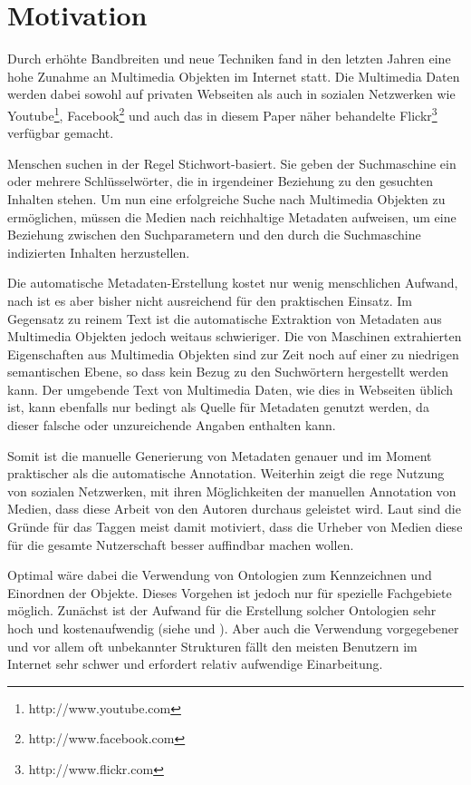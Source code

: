 \section{Motivation}

Durch erhöhte Bandbreiten und neue Techniken fand in den letzten Jahren eine hohe Zunahme an Multimedia Objekten im Internet statt. Die Multimedia Daten werden dabei sowohl auf privaten Webseiten als auch in sozialen Netzwerken wie Youtube\footnote{http://www.youtube.com}, Facebook\footnote{http://www.facebook.com} und auch das in diesem Paper näher behandelte Flickr\footnote{http://www.flickr.com} verfügbar gemacht.

Menschen suchen in der Regel Stichwort-basiert. Sie geben der Suchmaschine ein oder mehrere Schlüsselwörter, die in irgendeiner Beziehung zu den gesuchten Inhalten stehen. Um nun eine erfolgreiche Suche nach Multimedia Objekten zu ermöglichen, müssen die Medien nach \cite{collectiveKnowledge} reichhaltige Metadaten aufweisen, um eine Beziehung zwischen den Suchparametern und den durch die Suchmaschine indizierten Inhalten herzustellen. 

Die automatische Metadaten-Erstellung kostet nur wenig menschlichen Aufwand, nach \cite{combiningMultipleEvidence} ist es aber bisher nicht ausreichend für den praktischen Einsatz. Im Gegensatz zu reinem Text ist die automatische Extraktion von Metadaten aus Multimedia Objekten jedoch weitaus schwieriger. Die von Maschinen extrahierten Eigenschaften aus Multimedia Objekten sind zur Zeit noch auf einer zu niedrigen semantischen Ebene, so dass kein Bezug zu den Suchwörtern hergestellt werden kann. Der umgebende Text von Multimedia Daten, wie dies in Webseiten üblich ist, kann ebenfalls nur bedingt als Quelle für Metadaten genutzt werden, da dieser falsche oder unzureichende Angaben enthalten kann.

Somit ist die manuelle Generierung von Metadaten genauer und im Moment praktischer als die automatische Annotation. Weiterhin zeigt die rege Nutzung von sozialen Netzwerken, mit ihren Möglichkeiten der manuellen Annotation von Medien, dass diese Arbeit von den Autoren durchaus geleistet wird. Laut \cite{whyWeTag} sind die Gründe für das Taggen meist damit motiviert, dass die Urheber von Medien diese für die gesamte Nutzerschaft besser auffindbar machen wollen. 

Optimal wäre dabei die Verwendung von Ontologien zum Kennzeichnen und Einordnen der Objekte. Dieses Vorgehen ist jedoch nur für spezielle Fachgebiete möglich. Zunächst ist der Aufwand für die Erstellung solcher Ontologien sehr hoch und kostenaufwendig (siehe \cite{ontology_expensive1} und \cite{ontology_expensive2}). Aber auch die Verwendung vorgegebener und vor allem oft unbekannter Strukturen fällt den meisten Benutzern im Internet sehr schwer und erfordert relativ aufwendige Einarbeitung.

